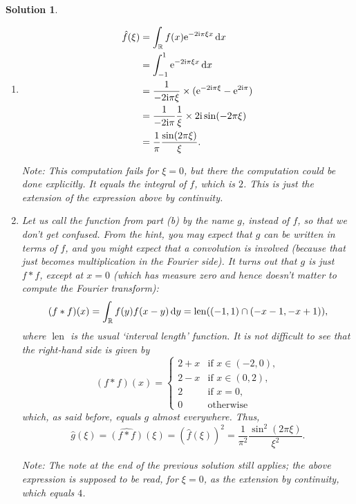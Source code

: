 \documentclass{article}
\theoremstyle{nonumberplain}
\newtheorem{sol}{Solution}
\newcommand{\R}{\mathbb{R}}
\newcommand{\e}{\mathrm{e}}
\newcommand{\I}{\mathrm{i}}
\DeclareMathOperator{\len}{len}
\begin{document}
\begin{sol}
\leavevmode
\begin{enumerate}
\item
\begin{equation}
\begin{aligned}
\hat f(\xi)
&= \int_\R f(x) \e^{- 2 \I \pi \xi x} \dl x\\
&= \int_{-1}^1 \e^{- 2 \I \pi \xi x} \dl x\\
&= \frac1{-2\I\pi \xi} \times (\e^{-2\I\pi \xi} - \e^{2\I\pi})\\
&= \frac1{-2\I\pi} \frac1\xi \times 2\I \sin(-2\pi\xi)\\
&= \frac1\pi \frac{\sin(2\pi\xi)}\xi.
\end{aligned}
\end{equation}

Note: This computation fails for $\xi = 0$, but there the computation could be done explicitly. It equals the integral of $f$, which is $2$. This is just the extension of the expression above by continuity.

\item Let us call the function from part (b) by the name $g$, instead of $f$, so that we don't get confused. From the hint, you may expect that $g$ can be written in terms of $f$, and you might expect that a convolution is involved (because that just becomes multiplication in the Fourier side). It turns out that $g$ is just $f * f$, except at $x=0$ (which has measure zero and hence doesn't matter to compute the Fourier transform):
\begin{equation}
(f*f)(x) = \int_\R f(y) f(x-y) \dl y = \len((-1,1) \cap (-x-1, -x+1)),
\end{equation}
where $\len$ is the usual `interval length' function. It is not difficult to see that the right-hand side is given by
\begin{equation}
(f*f)(x) = \begin{cases}
2+x & \text{if $x \in (-2,0)$},\\
2-x & \text{if $x \in (0,2)$},\\
2 & \text{if $x = 0$},\\
0 & \text{otherwise}
\end{cases}
\end{equation}
which, as said before, equals $g$ almost everywhere. Thus,
\begin{equation}
\hat g(\xi) = \widehat{(f*f)}(\xi) = (\hat f(\xi))^2 = \frac1{\pi^2} \frac{\sin^2(2\pi\xi)}{\xi^2}.
\end{equation}

Note: The note at the end of the previous solution still applies; the above expression is supposed to be read, for $\xi = 0$, as the extension by continuity, which equals $4$.
\end{enumerate}
\end{sol}
\end{document}
